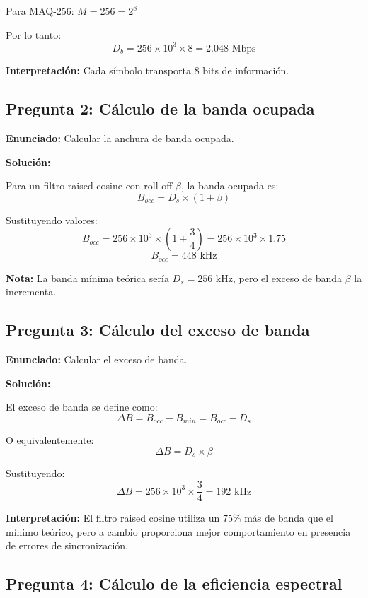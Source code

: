 \documentclass[11pt,a4paper]{article}
\begin{document}
Para MAQ-256: $M = 256 = 2^8$

Por lo tanto:
\[
D_b = 256 \times 10^3 \times 8 = \boxed{2.048 \text{ Mbps}}
\]

\textbf{Interpretaci\'on:} Cada s\'imbolo transporta 8 bits de informaci\'on.



\subsection*{Pregunta 2: C\'alculo de la banda ocupada}

\textbf{Enunciado:} Calcular la anchura de banda ocupada.

\vspace{0.3cm}
\textbf{Soluci\'on:}

Para un filtro raised cosine con roll-off $\beta$, la banda ocupada es:
\[
B_{occ} = D_s \times (1 + \beta)
\]

Sustituyendo valores:
\[
B_{occ} = 256 \times 10^3 \times \left(1 + \frac{3}{4}\right) = 256 \times 10^3 \times 1.75
\]
\[
B_{occ} = \boxed{448 \text{ kHz}}
\]

\textbf{Nota:} La banda m\'inima te\'orica ser\'ia $D_s = 256$ kHz, pero el exceso de banda $\beta$ la incrementa.



\subsection*{Pregunta 3: C\'alculo del exceso de banda}

\textbf{Enunciado:} Calcular el exceso de banda.

\vspace{0.3cm}
\textbf{Soluci\'on:}

El exceso de banda se define como:
\[
\Delta B = B_{occ} - B_{min} = B_{occ} - D_s
\]

O equivalentemente:
\[
\Delta B = D_s \times \beta
\]

Sustituyendo:
\[
\Delta B = 256 \times 10^3 \times \frac{3}{4} = \boxed{192 \text{ kHz}}
\]

\textbf{Interpretaci\'on:} El filtro raised cosine utiliza un 75\% m\'as de banda que el m\'inimo te\'orico, pero a cambio proporciona mejor comportamiento en presencia de errores de sincronizaci\'on.



\subsection*{Pregunta 4: C\'alculo de la eficiencia espectral}
\end{document}
